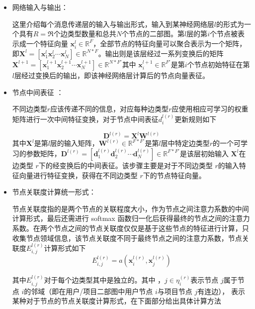 \documentclass{ctexart}
\begin{document}
\begin{itemize}
    \item 网络输入与输出：
    
    这里介绍每个消息传递层的输入与输出形式，输入到某神经网络层$l$的形式为一个具有$R = \mathfrak{R} $个边类型数量和总共$N$个节点的二部图。第$l$层的第$i$个节点被表示成一个特征向量 $\mathbf{x}_i^l\in\mathbb{R}^F$，全部节点的特征向量可以聚合表示为一个矩阵，即$\mathbf{X}^l=[\mathbf{x}_1^l\mathbf{x}_2^l\cdots \mathbf{x}_N^l]\in\mathbb{R}^{N*F}$。输出则是该层经过一系列变换后的矩阵$\mathbf{X}^{l+1}=[\mathbf{x}_1^{l+1}\mathbf{x}_2^{l+1}\cdots \mathbf{x}_N^{l+1}]\in\mathbb{R}^{N*F'}$其中 $\mathbf{x}_i^{l+1}\in\mathbb{R}^{F'}$是第$i$个节点初始特征在第 $l$层经过变换后的输出，即该神经网络层计算后的节点向量表征。

    \item 节点中间表征 ：
    
    不同边类型$r$应该传递不同的信息，对应每种边类型$r$应使用相应可学习的权重矩阵进行一次中间特征变换，对于节点中间表征$d_i^{l(r)}$更新规则如下


    \begin{equation}
        \mathbf{D}^{l(r)}=\mathbf{X}^l\mathbf{W}^{l(r)}
    \label{}
    \end{equation}
​    
其中$\mathbf{X}^l$是第$l$层的输入矩阵，$\mathbf{W}^{l(r)}\in\mathbb{R}^{F*F'}$是第$l$层中特定边类型$r$的一个可学习的参数矩阵，$\mathbf{D}^{l(r)}=[\mathbf{d}_1^{l(r)}\mathbf{d}_2^{l(r)}\cdots \mathbf{d}_N^{l(r)}]\in\mathbb{R}^{F*F'}$是该层初始输入 $\mathbf{X}^l$在边类型 $r$下的经变换后的中间表征。该步骤主要是对于不同边类型 $r$的输入特征向量进行特征变换，获得在不同边类型 $r$下的节点特征向量。
    \item 节点关联度计算统一形式：
    
    节点关联度指的是两个节点的关联程度大小，作为节点之间注意力系数的中间计算形式，最后还需进行 softmax 函数归一化后获得最终的节点之间的注意力系数。在两个节点之间的节点关联度仅仅是基于这些节点的特征进行计算，只收集节点领域信息，该节点关联度不同于最终节点之间的注意力系数，节点关联度$E_{i,j}^{l(r)}$计算形式如下
\begin{equation}
    E_{i,j}^{l(r)}=a(\mathbf{x}_i^{l(r)},\mathbf{x}_j^{l(r)})
\end{equation}
  
其中$E_{i,j}^{l(r)}$对于每个边类型其中是独立的。其中 ，$j\in \eta_i^{(r)}$表示节点 $j$属于节点 $i$的邻域（即在用户/项目二部图中用户节点 $i$与项目节点 $j$有连边）， 表示某种对于节点的节点关联度计算形式，在下面部分给出具体计算方法


\end{itemize}
\end{document}
